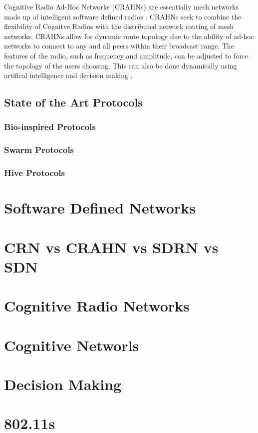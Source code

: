 Cognitive Radio Ad-Hoc Networks (CRAHNs) are essentially mesh networks made up of intelligent software defined radios \cite{Akyildiz2009810}. CRAHNs seek to combine the flexibility of Cognitve Radios with the distributed network routing of mesh networks. CRAHNs allow for dynamic route topology due to the ability of ad-hoc networks to connect to any and all peers within their broadcast range. The features of the radio, such as frequency and amplitude, can be adjusted to force the topology of the users choosing. This can also be done dynamically using artifical intelligence and decision making \cite{Akyildiz2009810}. 

\subsection{State of the Art Protocols}

\subsubsection{Bio-inspired Protocols}

\subsubsection{Swarm Protocols}

\subsubsection{Hive Protocols}

\section{Software Defined Networks}

\section{CRN vs CRAHN vs SDRN vs SDN}

\section{Cognitive Radio Networks}

\section{Cognitive Networls}

\section{Decision Making}

\section{802.11s}



